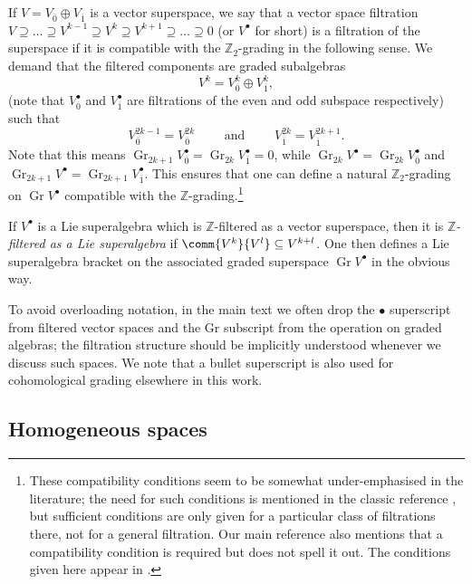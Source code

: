 \documentclass[pdftex]{sigma}
\numberwithin{equation}{section}
\newcommand{\ZZ}{\mathbb{Z}}
\newcommand{\1}{\mathbbm{1}}
\DeclareMathOperator{\Gr}{Gr}
\begin{document}
If $V=V_{\overline{0}}\oplus V_{\overline{1}}$ is a vector superspace, we say that a vector space filtration $V \supseteq \dots \supseteq V^{k-1} \supseteq V^k \supseteq V^{k+1} \supseteq \dots \supseteq 0$ (or $V^\bullet$ for short) is a filtration of the superspace if it is compatible with the $\ZZ_2$-grading in the following sense. We demand that the filtered components are graded subalgebras
\begin{equation}\label{eq:filter-super-1}
	V^k = V^k_{\overline{0}} \oplus V^k_{\overline{1}},
\end{equation}
(note that $V^\bullet_{\overline{0}}$ and $V^\bullet_{\overline{1}}$ are filtrations of the even and odd subspace respectively) such that
\begin{equation}\label{eq:filter-super-2}
	V^{2k-1}_{\overline{0}} = V^{2k}_{\overline{0}}
	\qquad	\text{ and } \qquad
	V^{2k}_{\overline{1}} = V^{2k+1}_{\overline{1}}.
\end{equation}
Note that this means $\Gr_{2k+1}V^\bullet_{\overline 0}=\Gr_{2k}V^\bullet_{\overline 1}=0$, while $\Gr_{2k} V^\bullet=\Gr_{2k} V^\bullet_{\overline0}$ and $\Gr_{2k+1} V^\bullet = \Gr_{2k+1} V^\bullet_{\overline 1}$. This ensures that one can define a natural $\ZZ_2$-grading on $\Gr V^\bullet$ compatible with the $\ZZ$-grading.\footnote{These compatibility conditions seem to be somewhat under-emphasised in the literature; the need for such conditions is mentioned in the classic reference \cite{Kac1977}, but sufficient conditions are only given for a particular class of filtrations there, not for a general filtration. Our main reference \cite{Cheng1998} also mentions that a compatibility condition is required but does not spell it out. The conditions given here appear in \cite{Scheunert1979}.}

If $V^\bullet$ is a Lie superalgebra which is $\ZZ$-filtered as a vector superspace, then it is \emph{$\ZZ$-filtered as a Lie superalgebra} if $\comm{V^k}{V^l}\subseteq V^{k+l}$. One then defines a Lie superalgebra bracket on the associated graded superspace $\Gr V^\bullet$ in the obvious way.

To avoid overloading notation, in the main text we often drop the $\bullet$ superscript from filtered vector spaces and the $\mathrm{Gr}$ subscript from the operation on graded algebras; the filtration structure should be implicitly understood whenever we discuss such spaces. We note that a bullet superscript is also used for cohomological grading elsewhere in this work.
	
\subsection{Homogeneous spaces}
\label{sec:homog-spaces}
\end{document}
